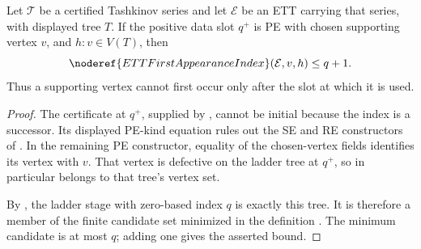 \begin{helper}
Let \(\mathcal T\) be a certified Tashkinov series and let \(\mathcal E\)
be an ETT carrying that series, with displayed tree \(T\).  If the positive
data slot \(q^+\) is PE with chosen supporting vertex \(v\), and
\(h:v\in V(T)\), then
\[
 \noderef{ETTFirstAppearanceIndex}(\mathcal E,v,h)\le q+1.
\]
Thus a supporting vertex cannot first occur only after the slot at which it
is used.
\end{helper}
\begin{proof}
The certificate at \(q^+\), supplied by , cannot
be initial because the index is a successor.  Its displayed PE-kind
equation rules out the SE and RE constructors of
.  In the remaining PE constructor, equality
of the chosen-vertex fields identifies its
 vertex with \(v\).  That vertex is
defective on the ladder tree at \(q^+\), so in particular belongs to that
tree's vertex set.

By , the ladder stage with zero-based
index \(q\) is exactly this tree.  It is therefore a member of the finite
candidate set minimized in the definition
.  The minimum candidate is at most \(q\);
adding one gives the asserted bound.
\end{proof}
